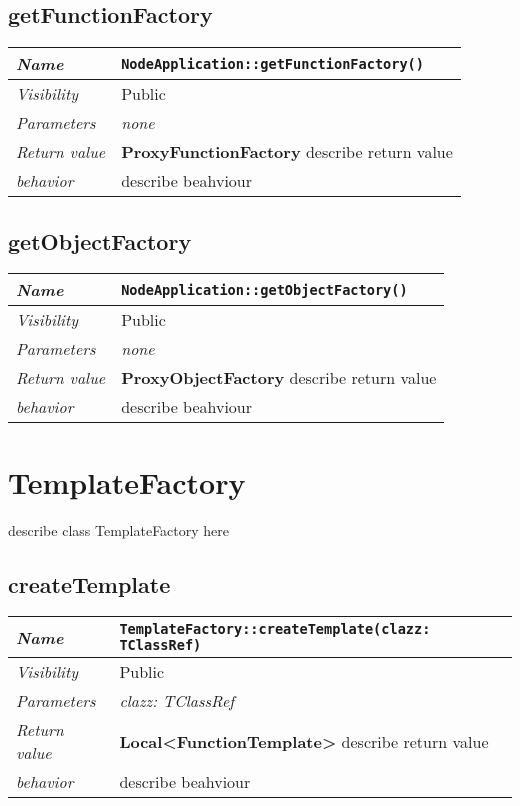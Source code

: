  \section{getFunctionFactory}
\begin{longtable}{p{3cm} @{\hskip 1cm} p{12cm}}
 \hline
\textit{Name} & \texttt{NodeApplication::getFunctionFactory()}\\
\hline
 \textit{Visibility} & Public \\
\hline
\textit{Parameters} & \textit{none}\\
\hline
\textit{Return value} & \textbf{ ProxyFunctionFactory} describe return value\\
  \hline
 \textit{behavior} & describe beahviour \\
\hline
\end{longtable} \pagebreak
 \section{getObjectFactory}
\begin{longtable}{p{3cm} @{\hskip 1cm} p{12cm}}
 \hline
\textit{Name} & \texttt{NodeApplication::getObjectFactory()}\\
\hline
 \textit{Visibility} & Public \\
\hline
\textit{Parameters} & \textit{none}\\
\hline
\textit{Return value} & \textbf{ ProxyObjectFactory} describe return value\\
  \hline
 \textit{behavior} & describe beahviour \\
\hline
\end{longtable} \pagebreak
 \chapter{TemplateFactory}
describe class TemplateFactory here
\section{createTemplate}
\begin{longtable}{p{3cm} @{\hskip 1cm} p{12cm}}
 \hline
\textit{Name} & \texttt{TemplateFactory::createTemplate(clazz: TClassRef)}\\
\hline
 \textit{Visibility} & Public \\
\hline
\textit{Parameters} & \textit{clazz: TClassRef}\\
\hline
\textit{Return value} & \textbf{ Local<FunctionTemplate>} describe return value\\
  \hline
 \textit{behavior} & describe beahviour \\
\hline
\end{longtable} \pagebreak
